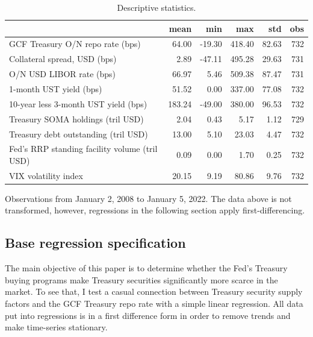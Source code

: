 \documentclass[11pt,a4paper,english,oneside]{article}
\begin{document}
\begin{table}[!h] \centering
\begin{threeparttable}
\caption{Descriptive statistics.}
\begin{tabular}{lrrrrr}
\toprule
{} &    mean &    min &     max &    std &  obs \\
\midrule
GCF Treasury O/N repo rate (bps) &   64.00 & -19.30 &  418.40 &  82.63 &  732 \\
Collateral spread, USD (bps) &    2.89 & -47.11 &  495.28 &  29.63 &  731 \\
O/N USD LIBOR rate (bps) &   66.97 &   5.46 &  509.38 &  87.47 &  731 \\
1-month UST yield (bps) &   51.52 &   0.00 &  337.00 &  77.08 &  732 \\
10-year less 3-month UST yield (bps) &  183.24 & -49.00 &  380.00 &  96.53 &  732 \\
Treasury SOMA holdings (tril USD) &    2.04 &   0.43 &    5.17 &   1.12 &  729 \\
Treasury debt outstanding (tril USD) &   13.00 &   5.10 &   23.03 &   4.47 &  732 \\
Fed's RRP standing facility volume (tril USD) &    0.09 &   0.00 &    1.70 &   0.25 &  732 \\
VIX volatility index &   20.15 &   9.19 &   80.86 &   9.76 &  732 \\
\bottomrule
\end{tabular}
Observations from January 2, 2008 to January 5, 2022. The data above is not transformed, however, regressions in the following section apply first-differencing.
\label{table:stats}
\end{threeparttable}
\end{table}

\subsection{Base regression specification} \label{sec:base}

The main objective of this paper is to determine whether the Fed's Treasury buying programs make Treasury securities significantly more scarce in the market. To see that, I test a casual connection between Treasury security supply factors and the GCF Treasury repo rate with a simple linear regression. All data put into regressions is in a first difference form in order to remove trends and make time-series stationary.
\end{document}
